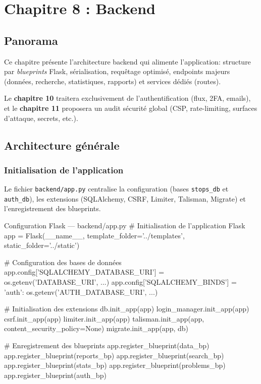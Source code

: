 \chapter{Chapitre 8 : Backend}

\section*{Panorama}

Ce chapitre présente l'architecture backend qui alimente l'application: structure par \textit{blueprints} Flask, sérialisation, requêtage optimisé, endpoints majeurs (données, recherche, statistiques, rapports) et services dédiés (routes). 

Le \textbf{chapitre 10} traitera exclusivement de l'authentification (flux, 2FA, emails), et le \textbf{chapitre 11} proposera un audit sécurité global (CSP, rate-limiting, surfaces d'attaque, secrets, etc.).

\section{Architecture générale}
\subsection*{Initialisation de l'application}

Le fichier \texttt{backend/app.py} centralise la configuration (bases \texttt{stops\_db} et \texttt{auth\_db}), les extensions (SQLAlchemy, CSRF, Limiter, Talisman, Migrate) et l'enregistrement des blueprints.

\begin{codebox}[language=Python]{Configuration Flask — backend/app.py}
# Initialisation de l'application Flask
app = Flask(__name__, 
           template_folder='../templates', 
           static_folder='../static')

# Configuration des bases de données
app.config['SQLALCHEMY_DATABASE_URI'] = os.getenv('DATABASE_URI', ...)
app.config['SQLALCHEMY_BINDS'] = {
    'auth': os.getenv('AUTH_DATABASE_URI', ...)
}

# Initialisation des extensions
db.init_app(app)
login_manager.init_app(app)
csrf.init_app(app)
limiter.init_app(app)
talisman.init_app(app, content_security_policy=None)
migrate.init_app(app, db)

# Enregistrement des blueprints
app.register_blueprint(data_bp)
app.register_blueprint(reports_bp)
app.register_blueprint(search_bp)
app.register_blueprint(stats_bp)
app.register_blueprint(problems_bp)
app.register_blueprint(auth_bp)
\end{codebox}

